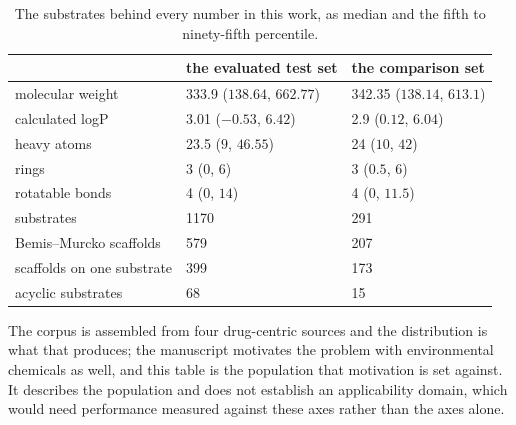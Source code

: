 \begin{table}[h]
\centering\small
\begin{threeparttable}
\caption{The substrates behind every number in this work, as median and the fifth to ninety-fifth percentile.}
\label{tab:si-applicability}
\begin{tabular}{lll}
\toprule
 & the evaluated test set & the comparison set \\
\midrule
molecular weight & 333.9 ($138.64$, $662.77$) & 342.35 ($138.14$, $613.1$) \\
calculated logP & 3.01 ($-0.53$, $6.42$) & 2.9 ($0.12$, $6.04$) \\
heavy atoms & 23.5 ($9$, $46.55$) & 24 ($10$, $42$) \\
rings & 3 ($0$, $6$) & 3 ($0.5$, $6$) \\
rotatable bonds & 4 ($0$, $14$) & 4 ($0$, $11.5$) \\
\midrule
substrates & 1170 & 291 \\
Bemis--Murcko scaffolds & 579 & 207 \\
scaffolds on one substrate & 399 & 173 \\
acyclic substrates & 68 & 15 \\
\bottomrule
\end{tabular}
\begin{tablenotes}[flushleft]\footnotesize
\item The corpus is assembled from four drug-centric sources and the distribution is what that produces; the manuscript motivates the problem with environmental chemicals as well, and this table is the population that motivation is set against. It describes the population and does not establish an applicability domain, which would need performance measured against these axes rather than the axes alone.
\end{tablenotes}
\end{threeparttable}
\end{table}
